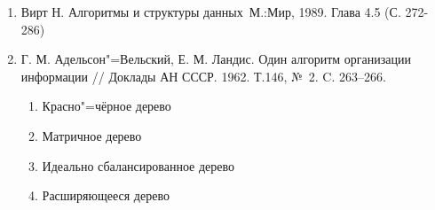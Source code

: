 \begin{enumerate}
    \item Вирт Н. Алгоритмы и структуры данных М.:Мир, 1989. Глава 4.5 (С. 272-286)
    \item Г. М. Адельсон"=Вельский, Е. М. Ландис. Один алгоритм организации информации
    // Доклады АН СССР. 1962. Т.146, № 2. C. 263–266.
    \begin{enumerate}
        \item Красно"=чёрное дерево
        \item Матричное дерево
        \item Идеально сбалансированное дерево
        \item Расширяющееся дерево
    \end{enumerate}
\end{enumerate}